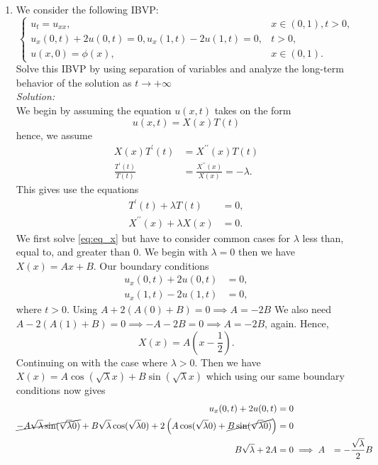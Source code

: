 \documentclass[10pt]{amsart}
\theoremstyle{nonumberplain}
\begin{document}
\begin{enumerate}[label={\bf {\arabic*}:}]
\item We consider the following IBVP:
$$
\begin{cases}
u_t = u_{xx}, &x \in (0, 1), t> 0, \\
u_x(0, t) + 2u(0, t) = 0, u_x(1, t) - 2u(1, t) = 0, &t > 0, \\
u(x, 0) = \phi(x), &x \in (0, 1).
\end{cases}
$$
Solve this IBVP by using separation of variables and analyze the long-term behavior of the solution as $t \rightarrow +\infty$
\\

\noindent
\textit{Solution:} \\
We begin by assuming the equation $u(x, t)$ takes on the form
$$u(x, t) = X(x)T(t)$$
hence, we assume
\begin{align*}
X(x)T^\prime(t) &= X^{\prime\prime}(x)T(t) \\
\frac{T^\prime(t)}{T(t)} &= \frac {X^{\prime\prime}(x)} {X(x)} = -\lambda.
\end{align*}
This gives use the equations
\begin{align}
T^\prime(t) + \lambda T(t) &= 0 \label{eq:eq_t}, \\
X^{\prime\prime}(x) + \lambda X(x) &= 0 \label{eq:eq_x}.
\end{align}
We first solve \eqref{eq:eq_x} but have to consider common cases for $\lambda$ less than, equal to, and greater than 0.
We begin with $\lambda = 0$ then we have $X(x) = Ax +B$.
Our boundary conditions
\begin{align*}
u_x(0, t) + 2u(0, t) &= 0, \\
u_x(1, t) - 2u(1, t) &= 0,
\end{align*}
where $ t > 0$.
Using $A + 2(A(0) + B) = 0 \implies A = -2B$
We also need $A - 2(A(1) + B) = 0 \implies - A - 2B = 0 \implies A = -2B$, again.
Hence,
$$X(x) = A \left( x - \frac 1 2 \right). $$
Continuing on with the case where $\lambda >  0$.
Then we have
$X(x) = A\cos(\sqrt \lambda x) + B\sin(\sqrt \lambda x) $
which using our same boundary conditions now gives
\begin{align*}
u_x(0, t) + 2u(0, t) &= 0 \\
\cancel{-A \sqrt \lambda \sin(\sqrt \lambda 0)} + B \sqrt \lambda \cos(\sqrt \lambda 0) + 2 \left(  A\cos(\sqrt \lambda 0) + \cancel{ B\sin(\sqrt \lambda 0)} \right) &= 0 \\
B \sqrt \lambda + 2A &= 0 \implies
A &= - \frac {\sqrt \lambda} 2 B

\end{align*}
\end{enumerate}
\end{document}
